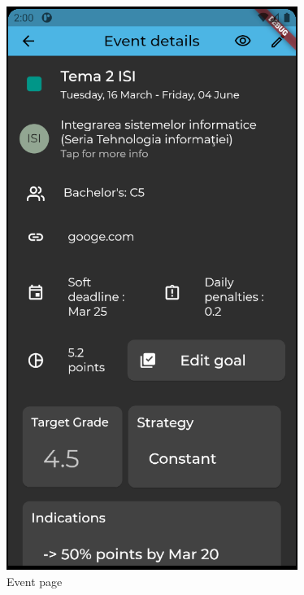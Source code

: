 \begin{figure}[!ht]
    \centering
    \begin{minipage}[b]{0.35\textwidth}
        \captionsetup{justification=centering}
        \includegraphics[width=\textwidth]{figures/ss/image5.png}
        \caption{Event page}
        \label{5:fig:fevent}
    \end{minipage}

\end{figure}
